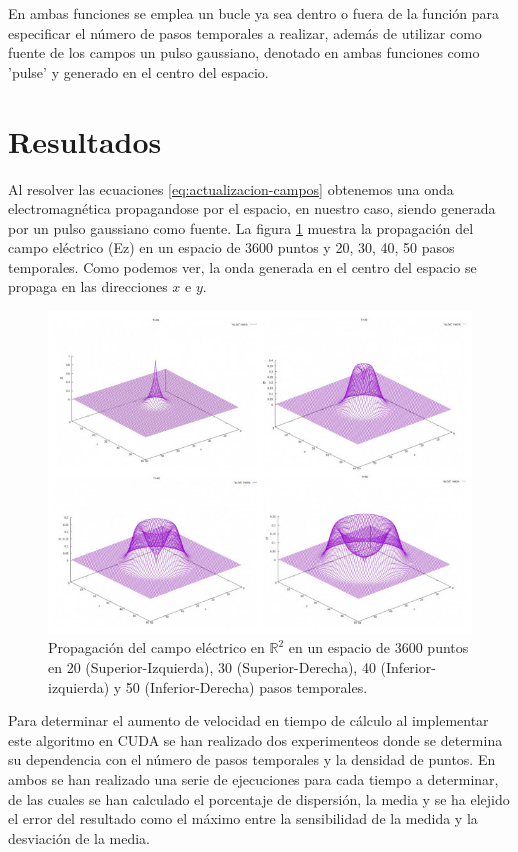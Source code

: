 \documentclass[11pt,a4paper,twoside,pdf]{article}
\numberwithin{equation}{section}
\begin{document}
En ambas funciones se emplea un bucle ya sea dentro o fuera de la función para especificar el número de pasos temporales a realizar, además de utilizar como fuente de los campos un pulso gaussiano, denotado en ambas funciones como 'pulse' y generado en el centro del espacio.





\section{Resultados}

Al resolver las ecuaciones \ref{eq:actualizacion-campos} obtenemos una onda electromagnética propagandose por el espacio, en nuestro caso, siendo generada por un pulso gaussiano como fuente. La figura \ref{fig:solucion} muestra la propagación del campo eléctrico (Ez) en un espacio de 3600 puntos y 20, 30, 40, 50 pasos temporales. Como podemos ver, la onda generada en el centro del espacio se propaga en las direcciones $x$ e $y$.  

\begin{figure}[h]
\centering
\includegraphics[width=15 cm]{Solution.JPG}				
\caption{Propagación del campo eléctrico en $\mathbb R^{2}$ en un espacio de 3600 puntos en 20 (Superior-Izquierda), 30 (Superior-Derecha), 40 (Inferior-izquierda) y 50 (Inferior-Derecha) pasos temporales.}
\label{fig:solucion}
\end{figure}
\noindent

Para determinar el aumento de velocidad en tiempo de cálculo al implementar este algoritmo en CUDA se han realizado dos experimenteos donde se determina su dependencia con el número de pasos temporales y la densidad de puntos. En ambos se han realizado una serie de ejecuciones para cada tiempo a determinar, de las cuales se han calculado el porcentaje de dispersión, la media y se ha elejido el error del resultado como el máximo entre la sensibilidad de la medida y la desviación de la media.
\end{document}
